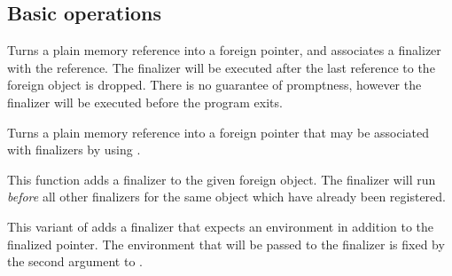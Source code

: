 \subsection{Basic operations}
\begin{haddockdesc}
\item[\begin{tabular}{@{}l}
newForeignPtr :: FinalizerPtr a -> Ptr a -> IO (ForeignPtr a)
\end{tabular}]
{\haddockbegindoc
Turns a plain memory reference into a foreign pointer, and
 associates a finalizer with the reference.  The finalizer will be
 executed after the last reference to the foreign object is dropped.
 There is no guarantee of promptness, however the finalizer will be
 executed before the program exits.\par}
\end{haddockdesc}
\begin{haddockdesc}
\item[\begin{tabular}{@{}l}
newForeignPtr{\char '137} :: Ptr a -> IO (ForeignPtr a)
\end{tabular}]
{\haddockbegindoc
Turns a plain memory reference into a foreign pointer that may be
 associated with finalizers by using .\par}
\end{haddockdesc}
\begin{haddockdesc}
\item[\begin{tabular}{@{}l}
addForeignPtrFinalizer :: FinalizerPtr a -> ForeignPtr a -> IO ()
\end{tabular}]
{\haddockbegindoc
This function adds a finalizer to the given foreign object.  The
 finalizer will run \emph{before} all other finalizers for the same
 object which have already been registered.\par}
\end{haddockdesc}
\begin{haddockdesc}
\item[\begin{tabular}{@{}l}
newForeignPtrEnv :: FinalizerEnvPtr env a -> Ptr env -> Ptr a -> IO (ForeignPtr a)
\end{tabular}]
{\haddockbegindoc
This variant of  adds a finalizer that expects an
 environment in addition to the finalized pointer.  The environment
 that will be passed to the finalizer is fixed by the second argument to
 .\par}
\end{haddockdesc}
